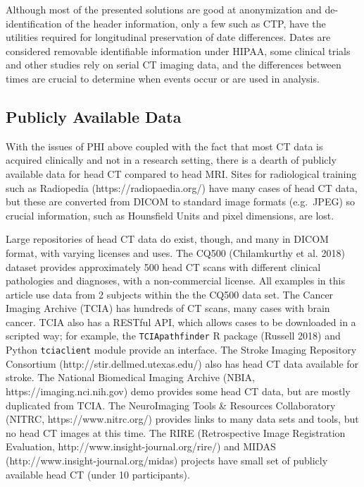\documentclass[]{elsarticle} %
\begin{document}
Although most of the presented solutions are good at anonymization and de-identification of the header information, only a few such as CTP, have the utilities required for longitudinal preservation of date differences. Dates are considered removable identifiable information under HIPAA, some clinical trials and other studies rely on serial CT imaging data, and the differences between times are crucial to determine when events occur or are used in analysis.

\hypertarget{publicly-available-data}{%
\subsection{Publicly Available Data}\label{publicly-available-data}}

With the issues of PHI above coupled with the fact that most CT data is acquired clinically and not in a research setting, there is a dearth of publicly available data for head CT compared to head MRI. Sites for radiological training such as Radiopedia (https://radiopaedia.org/) have many cases of head CT data, but these are converted from DICOM to standard image formats (e.g.~JPEG) so crucial information, such as Hounsfield Units and pixel dimensions, are lost.

Large repositories of head CT data do exist, though, and many in DICOM format, with varying licenses and uses. The CQ500 (Chilamkurthy et al. 2018) dataset provides approximately 500 head CT scans with different clinical pathologies and diagnoses, with a non-commercial license. All examples in this article use data from 2 subjects within the the CQ500 data set. The Cancer Imaging Archive (TCIA) has hundreds of CT scans, many cases with brain cancer. TCIA also has a RESTful API, which allows cases to be downloaded in a scripted way; for example, the \texttt{TCIApathfinder} R package (Russell 2018) and Python \texttt{tciaclient} module provide an interface. The Stroke Imaging Repository Consortium (http://stir.dellmed.utexas.edu/) also has head CT data available for stroke. The National Biomedical Imaging Archive (NBIA, https://imaging.nci.nih.gov) demo provides some head CT data, but are mostly duplicated from TCIA. The NeuroImaging Tools \& Resources Collaboratory (NITRC, https://www.nitrc.org/) provides links to many data sets and tools, but no head CT images at this time. The RIRE (Retrospective Image Registration Evaluation, http://www.insight-journal.org/rire/) and MIDAS (http://www.insight-journal.org/midas) projects have small set of publicly available head CT (under 10 participants).
\end{document}
